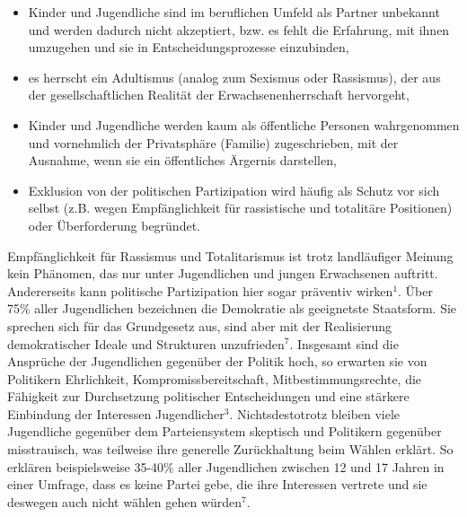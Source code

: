 {\begin{itemize}
\item Kinder und Jugendliche sind im beruflichen Umfeld als Partner unbekannt und werden dadurch nicht akzeptiert, bzw. es fehlt die Erfahrung, mit ihnen umzugehen und sie in Entscheidungsprozesse einzubinden,
\item es herrscht ein Adultismus (analog zum Sexismus oder Rassismus), der aus der gesellschaftlichen Realität der Erwachsenenherrschaft hervorgeht,
\item Kinder und Jugendliche werden kaum als öffentliche Personen wahrgenommen und vornehmlich der Privatsphäre (Familie) zugeschrieben, mit der Ausnahme, wenn sie ein öffentliches Ärgernis darstellen,
\item Exklusion von der politischen Partizipation wird häufig als {\Gu}Schutz{\Go} vor sich selbst (z.B. wegen Empfänglichkeit für rassistische und totalitäre Positionen) oder Überforderung begründet.
\end{itemize}

Empfänglichkeit für Rassismus und Totalitarismus ist trotz landläufiger Meinung kein Phänomen, das nur unter Jugendlichen und jungen Erwachsenen auftritt. Andererseits kann politische Partizipation hier sogar präventiv wirken$^1$. Über 75\% aller Jugendlichen bezeichnen die Demokratie als geeignetste Staatsform. Sie sprechen sich für das Grundgesetz aus, sind aber mit der Realisierung demokratischer Ideale und Strukturen unzufrieden$^7$. Insgesamt sind die Ansprüche der Jugendlichen gegenüber der Politik hoch, so erwarten sie von Politikern Ehrlichkeit, Kompromissbereitschaft, Mitbestimmungsrechte, die Fähigkeit zur Durchsetzung politischer Entscheidungen und eine stärkere Einbindung der Interessen Jugendlicher$^3$. Nichtsdestotrotz bleiben viele Jugendliche gegenüber dem Parteiensystem skeptisch und Politikern gegenüber misstrauisch, was teilweise ihre generelle Zurückhaltung beim Wählen erklärt. So erklären beispielsweise 35-40\% aller Jugendlichen zwischen 12 und 17 Jahren in einer Umfrage, dass es keine Partei gebe, die ihre Interessen vertrete und sie deswegen auch nicht wählen gehen würden$^7$.

}
